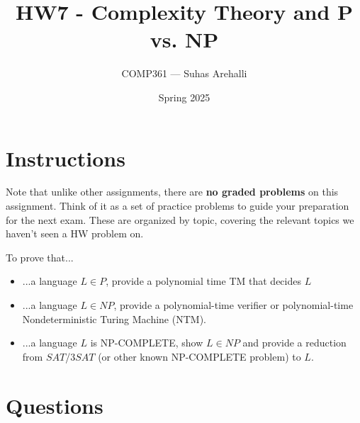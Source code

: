 \documentclass{exam}
\title{HW7 - Complexity Theory and P vs. NP}
\author{COMP361 --- Suhas Arehalli}
\date{Spring 2025}
\theoremstyle{definition}
\begin{document}
\maketitle

\section*{Instructions}
Note that unlike other assignments, there are \textbf{no graded problems} on this assignment. Think of it as a set of practice problems to guide your preparation for the next exam. These are organized by topic, covering the relevant topics we haven't seen a HW problem on.

To prove that...
\begin{itemize}
    \item ...a language $L \in P$, provide a polynomial time TM that decides $L$
    \item ...a language $L \in NP$, provide a polynomial-time verifier or polynomial-time Nondeterministic Turing Machine (NTM).
    \item ...a language $L$ is NP-COMPLETE, show $L \in NP$ and provide a reduction from $SAT$/$3SAT$ (or other known NP-COMPLETE problem) to $L$. 
\end{itemize}
\section*{Questions}
\end{document}
